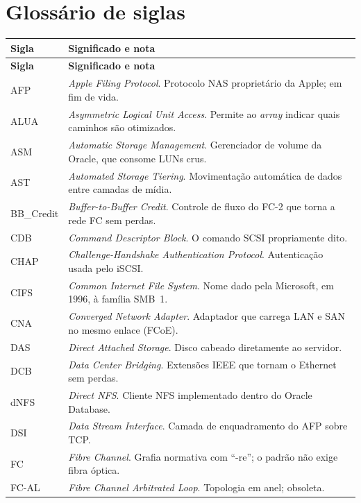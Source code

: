 \documentclass[11pt,a4paper]{article}
\begin{document}
\clearpage
\appendix
\section{Glossário de siglas}
{\scriptsize
\begin{longtable}{@{}p{1.9cm}p{13.2cm}@{}}
\toprule
\textbf{Sigla} & \textbf{Significado e nota} \\
\midrule
\endfirsthead
\toprule
\textbf{Sigla} & \textbf{Significado e nota} \\
\midrule
\endhead
\bottomrule
\endfoot
AFP & \textit{Apple Filing Protocol}. Protocolo NAS proprietário da Apple; em fim de vida. \\
ALUA & \textit{Asymmetric Logical Unit Access}. Permite ao \textit{array} indicar quais caminhos são
otimizados. \\
ASM & \textit{Automatic Storage Management}. Gerenciador de volume da Oracle, que consome LUNs crus. \\
AST & \textit{Automated Storage Tiering}. Movimentação automática de dados entre camadas de mídia. \\
BB\_Credit & \textit{Buffer-to-Buffer Credit}. Controle de fluxo do FC-2 que torna a rede FC sem
perdas. \\
CDB & \textit{Command Descriptor Block}. O comando SCSI propriamente dito. \\
CHAP & \textit{Challenge-Handshake Authentication Protocol}. Autenticação usada pelo iSCSI. \\
CIFS & \textit{Common Internet File System}. Nome dado pela Microsoft, em 1996, à família SMB~1. \\
CNA & \textit{Converged Network Adapter}. Adaptador que carrega LAN e SAN no mesmo enlace (FCoE). \\
DAS & \textit{Direct Attached Storage}. Disco cabeado diretamente ao servidor. \\
DCB & \textit{Data Center Bridging}. Extensões IEEE que tornam o Ethernet sem perdas. \\
dNFS & \textit{Direct NFS}. Cliente NFS implementado dentro do Oracle Database. \\
DSI & \textit{Data Stream Interface}. Camada de enquadramento do AFP sobre TCP. \\
FC & \textit{Fibre Channel}. Grafia normativa com ``-re''; o padrão não exige fibra óptica. \\
FC-AL & \textit{Fibre Channel Arbitrated Loop}. Topologia em anel; obsoleta. \\

\end{longtable}}
\end{document}

